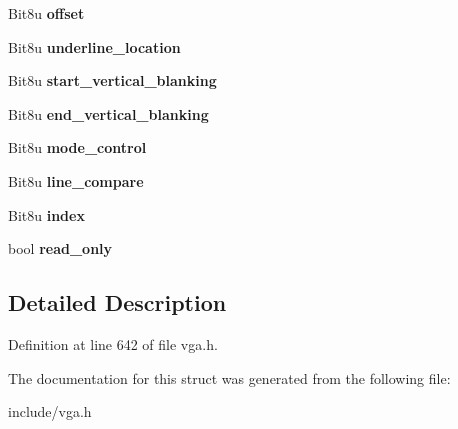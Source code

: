 \begin{DoxyCompactItemize}
\item 
\hypertarget{structVGA__Crtc_a4924ee33276c5db26c158fdf870a6dd8}{Bit8u {\bfseries offset}}\label{structVGA__Crtc_a4924ee33276c5db26c158fdf870a6dd8}

\item 
\hypertarget{structVGA__Crtc_a2219c487b03bb85f3ee0588f98d1d6a6}{Bit8u {\bfseries underline\-\_\-location}}\label{structVGA__Crtc_a2219c487b03bb85f3ee0588f98d1d6a6}

\item 
\hypertarget{structVGA__Crtc_a05e8dd8080f625dceb9b0f4b3306a346}{Bit8u {\bfseries start\-\_\-vertical\-\_\-blanking}}\label{structVGA__Crtc_a05e8dd8080f625dceb9b0f4b3306a346}

\item 
\hypertarget{structVGA__Crtc_a85198ae7825925a3350637af0e91ddc9}{Bit8u {\bfseries end\-\_\-vertical\-\_\-blanking}}\label{structVGA__Crtc_a85198ae7825925a3350637af0e91ddc9}

\item 
\hypertarget{structVGA__Crtc_a4786b1dec0548282000ee6842cdc818f}{Bit8u {\bfseries mode\-\_\-control}}\label{structVGA__Crtc_a4786b1dec0548282000ee6842cdc818f}

\item 
\hypertarget{structVGA__Crtc_a5a1744696d3efa6453e94c7283df9cb6}{Bit8u {\bfseries line\-\_\-compare}}\label{structVGA__Crtc_a5a1744696d3efa6453e94c7283df9cb6}

\item 
\hypertarget{structVGA__Crtc_a25c4b8626ae66354a428340e0cfbc231}{Bit8u {\bfseries index}}\label{structVGA__Crtc_a25c4b8626ae66354a428340e0cfbc231}

\item 
\hypertarget{structVGA__Crtc_a4775a262d32dd75cede031b15845a1eb}{bool {\bfseries read\-\_\-only}}\label{structVGA__Crtc_a4775a262d32dd75cede031b15845a1eb}

\end{DoxyCompactItemize}


\subsection{Detailed Description}


Definition at line 642 of file vga.\-h.



The documentation for this struct was generated from the following file\-:\begin{DoxyCompactItemize}
\item 
include/vga.\-h\end{DoxyCompactItemize}
